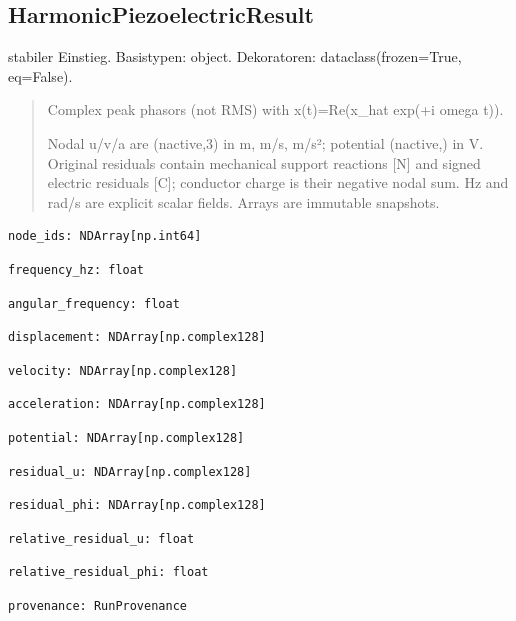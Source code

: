 \subsection{HarmonicPiezoelectricResult}
stabiler Einstieg.
Basistypen: object. Dekoratoren: dataclass(frozen=True, eq=False).
\begin{quote}
Complex peak phasors (not RMS) with x(t)=Re(x\_hat exp(+i omega t)).\par Nodal u/v/a are (nactive,3) in m, m/s, m/s²; potential (nactive,) in V. Original residuals contain mechanical support reactions [N] and signed electric residuals [C]; conductor charge is their negative nodal sum. Hz and rad/s are explicit scalar fields. Arrays are immutable snapshots.
\end{quote}
\begin{lstlisting}
node_ids: NDArray[np.int64]
\end{lstlisting}
\begin{lstlisting}
frequency_hz: float
\end{lstlisting}
\begin{lstlisting}
angular_frequency: float
\end{lstlisting}
\begin{lstlisting}
displacement: NDArray[np.complex128]
\end{lstlisting}
\begin{lstlisting}
velocity: NDArray[np.complex128]
\end{lstlisting}
\begin{lstlisting}
acceleration: NDArray[np.complex128]
\end{lstlisting}
\begin{lstlisting}
potential: NDArray[np.complex128]
\end{lstlisting}
\begin{lstlisting}
residual_u: NDArray[np.complex128]
\end{lstlisting}
\begin{lstlisting}
residual_phi: NDArray[np.complex128]
\end{lstlisting}
\begin{lstlisting}
relative_residual_u: float
\end{lstlisting}
\begin{lstlisting}
relative_residual_phi: float
\end{lstlisting}
\begin{lstlisting}
provenance: RunProvenance
\end{lstlisting}
